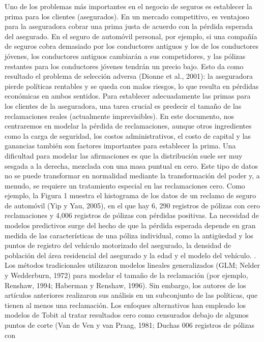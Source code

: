 \documentclass[]{article}
\begin{document}
Uno de los problemas más importantes en el negocio de seguros es
establecer la prima para los clientes (asegurados). En un mercado
competitivo, es ventajoso para la aseguradora cobrar una prima justa de
acuerdo con la pérdida esperada del asegurado. En el seguro de automóvil
personal, por ejemplo, si una compañía de seguros cobra demasiado por
los conductores antiguos y los de los conductores jóvenes, los
conductores antiguos cambiarán a sus competidores, y las pólizas
restantes para los conductores jóvenes tendrán un precio bajo. Esto da
como resultado el problema de selección adversa (Dionne et al., 2001):
la aseguradora pierde políticas rentables y se queda con malos riesgos,
lo que resulta en pérdidas económicas en ambos sentidos. Para establecer
adecuadamente las primas para los clientes de la aseguradora, una tarea
crucial es predecir el tamaño de las reclamaciones reales (actualmente
imprevisibles). En este documento, nos centraremos en modelar la pérdida
de reclamaciones, aunque otros ingredientes como la carga de seguridad,
los costos administrativos, el costo de capital y las ganancias también
son factores importantes para establecer la prima. Una dificultad para
modelar las afirmaciones es que la distribución suele ser muy sesgada a
la derecha, mezclada con una masa puntual en cero. Este tipo de datos no
se puede transformar en normalidad mediante la transformación del poder
y, a menudo, se requiere un tratamiento especial en las reclamaciones
cero. Como ejemplo, la Figura 1 muestra el histograma de los datos de un
reclamo de seguro de automóvil (Yip y Yau, 2005), en el que hay 6, 290
registros de pólizas con cero reclamaciones y 4,006 registros de pólizas
con pérdidas positivas. La necesidad de modelos predictivos surge del
hecho de que la pérdida esperada depende en gran medida de las
características de una póliza individual, como la antigüedad y los
puntos de registro del vehículo motorizado del asegurado, la densidad de
población del área residencial del asegurado y la edad y el modelo del
vehículo. . Los métodos tradicionales utilizaron modelos lineales
generalizados (GLM; Nelder y Wedderburn, 1972) para modelar el tamaño de
la reclamación (por ejemplo, Renshaw, 1994; Haberman y Renshaw, 1996).
Sin embargo, los autores de los artículos anteriores realizaron sus
análisis en un subconjunto de las políticas, que tienen al menos una
reclamación. Los enfoques alternativos han empleado los modelos de Tobit
al tratar resultados cero como censurados debajo de algunos puntos de
corte (Van de Ven y van Praag, 1981; Duchas 006 registros de pólizas con
\end{document}
